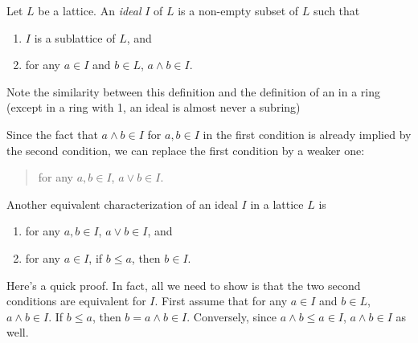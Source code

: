 \documentclass[12pt]{article}
\begin{document}
Let $L$ be a lattice.  An \emph{ideal} $I$ of $L$ is a non-empty subset of $L$ such that\
\begin{enumerate}
\item $I$ is a sublattice of $L$, and
\item for any $a\in I$ and $b\in L$, $a\wedge b\in I$.
\end{enumerate}

Note the similarity between this definition and the definition of an  in a ring (except in a ring with 1, an ideal is almost never a subring)

Since the fact that $a\wedge b\in I$ for $a,b\in I$ in the first condition is already implied by the second condition, we can replace the first condition by a weaker one: \begin{quote} for any $a,b\in I$, $a\vee b\in I$.\end{quote}

Another equivalent characterization of an ideal $I$ in a lattice $L$ is 
\begin{enumerate}
\item for any $a,b\in I$, $a\vee b\in I$, and
\item for any $a\in I$, if $b\le a$, then $b\in I$.
\end{enumerate}

Here's a quick proof.  In fact, all we need to show is that the two second conditions are equivalent for $I$.  First assume that for any $a\in I$ and $b\in L$, $a\wedge b\in I$.  If $b\le a$, then $b=a\wedge b\in I$.  Conversely, since $a\wedge b\le a\in I$, $a\wedge b\in I$ as well.
\end{document}
